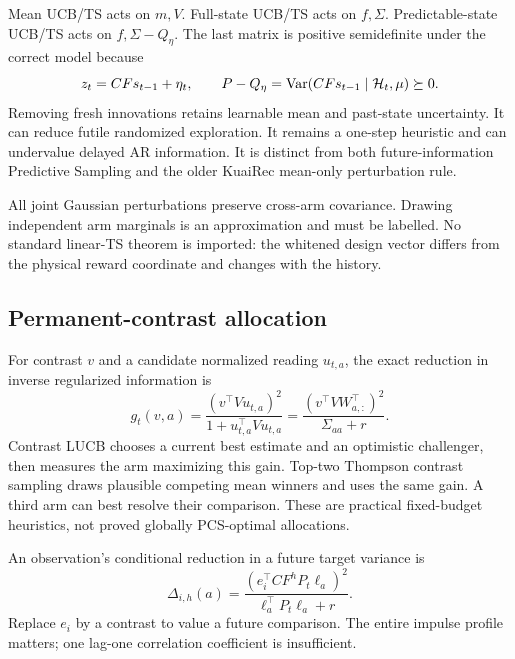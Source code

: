 Mean UCB/TS acts on $m,V$. Full-state UCB/TS acts on $f,\Sigma$. Predictable-state UCB/TS acts on $f,\Sigma-Q_\eta$. The last matrix is positive semidefinite under the correct model because
\begin{equation}
z_t=CFs_{t-1}+\eta_t,
\qquad P-Q_\eta=\operatorname{Var}(CFs_{t-1}\mid\mathcal H_t,\mu)\succeq0.
\end{equation}
Removing fresh innovations retains learnable mean and past-state uncertainty. It can reduce futile randomized exploration. It remains a one-step heuristic and can undervalue delayed AR information. It is distinct from both future-information Predictive Sampling and the older KuaiRec mean-only perturbation rule.

All joint Gaussian perturbations preserve cross-arm covariance. Drawing independent arm marginals is an approximation and must be labelled. No standard linear-TS theorem is imported: the whitened design vector differs from the physical reward coordinate and changes with the history.

\subsection{Permanent-contrast allocation}
For contrast $v$ and a candidate normalized reading $u_{t,a}$, the exact reduction in inverse regularized information is
\begin{equation}
g_t(v,a)=\frac{(v^\top Vu_{t,a})^2}{1+u_{t,a}^\top Vu_{t,a}}
=\frac{(v^\top VW_{a,:}^\top)^2}{\Sigma_{aa}+r}.
\end{equation}
Contrast LUCB chooses a current best estimate and an optimistic challenger, then measures the arm maximizing this gain. Top-two Thompson contrast sampling draws plausible competing mean winners and uses the same gain. A third arm can best resolve their comparison. These are practical fixed-budget heuristics, not proved globally PCS-optimal allocations.

An observation's conditional reduction in a future target variance is
\begin{equation}
\Delta_{i,h}(a)=\frac{(e_i^\top CF^hP_t\ell_a)^2}{\ell_a^\top P_t\ell_a+r}.
\end{equation}
Replace $e_i$ by a contrast to value a future comparison. The entire impulse profile matters; one lag-one correlation coefficient is insufficient.

